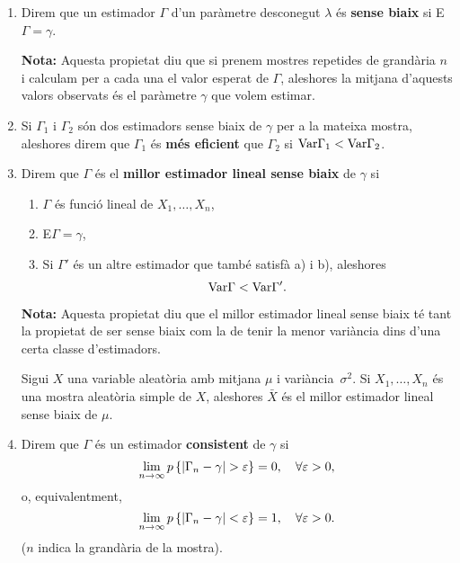 \begin{enumerate}

\item Direm que un estimador $\Gamma$ d'un par\`ametre desconegut $\lambda$ \'es
{\bf sense biaix} si E$\Gamma = \gamma$.

{\bf Nota:} Aquesta propietat diu que si prenem mostres repetides de grand\`aria $n$
i calculam per a cada una el valor esperat
de $\Gamma$, aleshores la mitjana d'aquests valors observats 
\'es el par\`ametre $\gamma$ que volem estimar.

\item Si $\Gamma_1$ i $\Gamma_2$ s\'on dos estimadors sense biaix de $\gamma$ per
a la mateixa mostra, aleshores direm que $\Gamma_1$ \'es {\bf m\'es eficient} que
$\Gamma_2$ si ${\rm Var} \Gamma_1 < {\rm Var} \Gamma_2$.

\item Direm que $\Gamma$ \'es el {\bf millor estimador lineal sense biaix} de
$\gamma$ si
\begin{enumerate}
\item $\Gamma$ \'es funci\'o lineal de $X_1, \ldots , X_n$,

\item E$\Gamma = \gamma$,

\item Si $\Gamma'$ \'es un altre estimador que tamb\'e satisf\`a a) i b), aleshores
$${\rm Var} \Gamma < {\rm Var} \Gamma'.$$
\end{enumerate}

{\bf Nota:} Aquesta propietat diu que el millor estimador lineal sense biaix t\'e
tant la propietat de ser sense biaix com la de tenir la menor vari\`ancia dins
d'una certa classe d'estimadors.

\begin{proposition}
Sigui $X$ una variable aleat\`oria amb mitjana $\mu$ i vari\`ancia~$\sigma^2$.
Si $X_1, \ldots , X_n$ \'es una mostra aleat\`oria simple de $X$,
aleshores $\bar{X}$ \'es el millor estimador lineal sense biaix de $\mu$.
\end{proposition}

\item Direm que $\Gamma$ \'es un estimador {\bf consistent} 
de $\gamma$ si
$$\lim_{n \to \infty} p\left\{|\Gamma_n-\gamma| > \varepsilon\right\} = 0,\quad\forall
\varepsilon >0,$$
o, equivalentment,
$$\lim_{n \to \infty} p\left\{|\Gamma_n-\gamma| < \varepsilon\right\} = 1,\quad
\forall \varepsilon > 0.$$
($n$ indica la grand\`aria de la mostra).


\end{enumerate}
